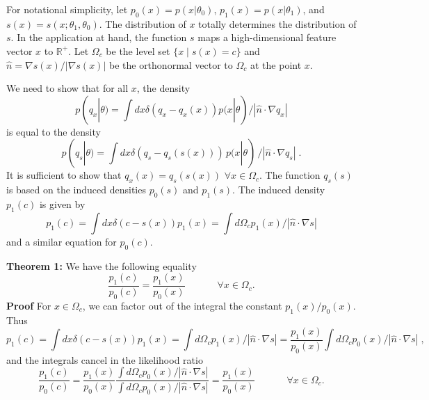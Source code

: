\documentclass[aoas,preprint]{imsart}
\numberwithin{equation}{section}
\theoremstyle{plain}
\begin{document}
For notational simplicity, let $p_0(x) = p(x|\theta_0)$, $p_1(x) = p(x|\theta_1)$, and $s(x)=s(x; \theta_1, \theta_0)$.
The distribution of $x$ totally determines the distribution of $s$. 
In the application at hand, the function $s$ maps a high-dimensional feature vector $x$ to $\mathbb{R}^+$.
Let $\Omega_{c}$ be the level set $\{x \mid s(x) = c \}$ and $\hat{n}=\nabla s(x) / |\nabla s(x)|$ be the orthonormal vector to $\Omega_c$ at the point $x$.

We need to show that for all $x$, the density
\begin{equation}
p(q_x|\theta) = \int dx \delta(q_x-q_x(x)) p(x|\theta)  / | \hat{n} \cdot \nabla q_x  | 
\end{equation}
is equal to the density
\begin{equation}
p(q_s|\theta) = \int dx \delta(q_s-q_s(s(x))) \, p(x|\theta) \, / | \hat{n} \cdot \nabla q_s  | \; .
\end{equation}
It is sufficient to show that $q_x(x) = q_s(s(x))$ $ \forall x\in\Omega_c$. The function $q_s(s)$ is based on the induced densities $p_0(s)$ and $p_1(s)$.  The induced density $p_1(c)$ is given by 
\begin{equation}
p_1(c) = \int dx \delta(c-s(x)) p_1(x) = \int d\Omega_c p_1(x)  / | \hat{n} \cdot \nabla s  |
\end{equation}
and a similar equation for $p_0(c)$. 

\textbf{\flushleft Theorem 1:}
We have the following equality
\begin{equation}
\frac{p_1(c)}{p_0(c)} =  \frac{p_1(x)}{p_0(x)}  \;\hspace{3em} \forall x\in\Omega_c.
\end{equation}
\textbf{Proof}
For $x\in \Omega_c$, we can factor out of the integral the constant $p_1(x)/p_0(x)$.
Thus
\begin{equation}
p_1(c) = \int dx \delta(c-s(x)) p_1(x) = \int d\Omega_c p_1(x) / | \hat{n} \cdot \nabla s  |= \frac{p_1(x)}{p_0(x)} \int d\Omega_c p_0(x)  / | \hat{n} \cdot \nabla s  | \;,
\end{equation}
and the integrals cancel in the likelihood ratio
\begin{equation}
\frac{p_1(c)}{p_0(c)} = \frac{p_1(x)}{p_0(x)} \frac{\int d\Omega_c p_0(x)/ | \hat{n} \cdot \nabla s  |}{ \int d\Omega_c p_0(x) / | \hat{n} \cdot \nabla s  |} = \frac{p_1(x)}{p_0(x)}  \;\hspace{3em} \forall x\in\Omega_c.
\end{equation}
\end{document}
